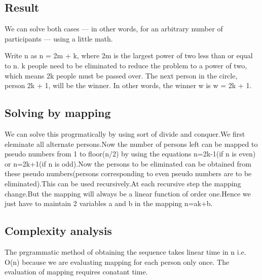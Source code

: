 \documentclass[12pt]{article}
\begin{document}
\subsection*{Result}
We can solve both cases — in other words, for an arbitrary number of participants — using a little math.

Write n as n = 2m + k, where 2m is the largest power of two less than or equal to n. k people need to be eliminated to reduce the problem to a power of two, which means 2k people must be passed over. The next person in the circle, person 2k + 1, will be the winner. In other words, the winner w is w = 2k + 1.




\subsection*{Solving by mapping}

We can solve this progrmatically by using sort of divide and conquer.We first eleminate all alternate persons.Now the number of persons left can be mapped to pseudo numbers from 1 to floor(n/2) by using the equations n=2k-1(if n is even) or n=2k+1(if n is odd).Now the persons to be eliminated can be obtained from these pseudo numbers(persons corresponding to even pseudo numbers are to be eliminated).This can be used recursively.At each recursive step the mapping change.But the mapping will always be a linear function of order one.Hence we just have to maintain 2 variables a and b in the mapping n=ak+b.

\subsection*{Complexity analysis}
The prgrammatic method of obtaining the sequence takes linear time  in n i.e. O(n) because we are evaluating mapping for each person only once. The evaluation of mapping requires conatant time.
\end{document}

